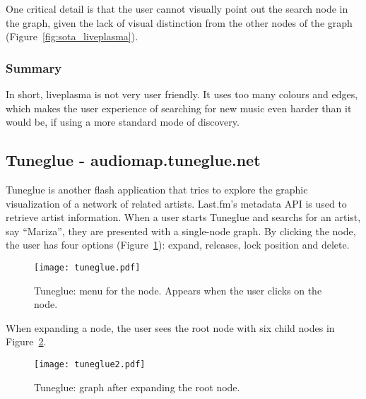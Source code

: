       One critical detail is that the user cannot visually point out the search node in the graph, given the lack of visual distinction from the other nodes of the graph (Figure~\ref{fig:sota_liveplasma}).


    \subsubsection{Summary} %
    \label{ssub:liveplasma_summary}

      In short, liveplasma is not very user friendly. 
      It uses too many colours and edges, which makes the user experience of searching for new music even harder than it would be, if using a more standard mode of discovery.



  \subsection{Tuneglue - audiomap.tuneglue.net} %
  \label{sub:tuneglue}

    Tuneglue is another flash application that tries to explore the graphic visualization of a network of related artists.
    Last.fm's metadata API is used to retrieve artist information.
    When a user starts Tuneglue and searchs for an artist, say ``Mariza'', they are presented with a single-node graph.
    By clicking the node, the user has four options (Figure~\ref{fig:sota_tuneglue}): expand, releases, lock position and delete.


    \begin{figure}[hb]
      \begin{center}
        \texttt{[image: tuneglue.pdf]}
      \end{center}
      \caption{Tuneglue: menu for the node. Appears when the user clicks on the node.}
      \label{fig:sota_tuneglue}
    \end{figure}

    When expanding a node, the user sees the root node with six child nodes in Figure~\ref{fig:sota_tuneglue2}.

    \begin{figure}[H]
      \begin{center}
        \texttt{[image: tuneglue2.pdf]}
      \end{center}
      \caption{Tuneglue: graph after expanding the root node.}
      \label{fig:sota_tuneglue2}
    \end{figure}

